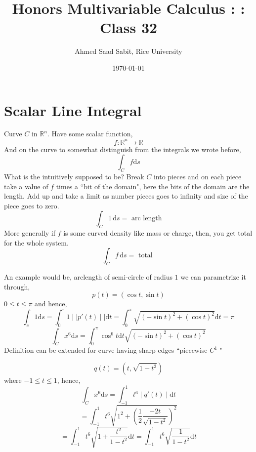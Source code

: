 \documentclass[letter]{article}
\title{Honors Multivariable Calculus : : Class 32}
\author{Ahmed Saad Sabit, Rice University}
\date{\today}
\begin{document}
\maketitle

\section{Scalar Line Integral}
Curve $C$ in $\mathbb{R}^{n}$. Have some scalar function, 
\[
f:\mathbb{R}^{n} \to \mathbb{R}
\] 
And on the curve to somewhat distinguish from the integrals we wrote before, 
\[
\int_C f \mathrm{d}  s
\]
What is the intuitively supposed to be? Break $C$ into pieces and on each piece take a value of $f$ times a ``bit of the domain", here the bits of the domain are the length. Add up and take a limit as number pieces goes to infinity and size of the piece goes to zero. 
\[
\int_C 1 \, \mathrm{d} s = \text{ arc length}
\]
More generally if $f$ is some curved density like mass or charge, then, you get total for the whole system. 
\[
\int_C f \, \mathrm{d} s = \text{ total }
\]



An example would be, arclength of semi-circle of radius $1$ we can parametrize it through, 
\[
p(t) = \left(\cos t, \sin t\right)
\] 
$0\le t \le \pi $ and hence,
\[
\int_c 1 \mathrm{d} s = \int_{0}^{\pi } 1  \mid  \mid p'(t)  \mid  \mid \mathrm{d} t = \int_{0}^{\pi }  \sqrt{ (-\sin t)^2 + (\cos t)^2}  \mathrm{d} t = \pi  
\]
\[
\int_C x^{6}\mathrm{d} s = \int_0^\pi  \cos ^{6} t\mathrm{d} t \sqrt{\left(- \sin t\right)^2 + \left(\cos t\right)^2 } 
\] 
Definition can be extended for curve having sharp edges ``piecewise $C^{1}$ " 

\[
q(t) = (t, \sqrt{1-t^2} )
\] 
where $-1 \le t \le 1$, hence,
\[
\int_C x^{6} \mathrm{d} s = \int_{-1}^{1} t ^{6}  \mid  q'(t)  \mid \mathrm{d} t 
\]  
\[
= \int_{-1}^{1}  t ^{6} \sqrt{1 ^2 + \left(\frac{1}{2} \frac{-2 t}{\sqrt{1 - t^2} }\right)^2}  
\]
\[
= \int_{-1}^{1} t ^{6} \sqrt{1 + \frac{t^2}{1 - t^2} }  \mathrm{d} t = \int_{-1}^{1} t ^{6} \sqrt{\frac{1}{1 - t^2}} \mathrm{d} t  
\] 
\end{document}
